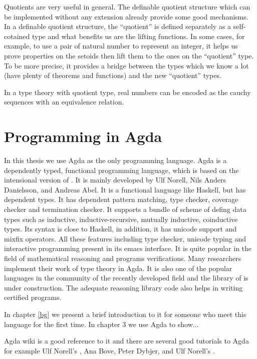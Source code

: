 
Quotients are very useful in general. The definable quotient structure
which can be implemented without any extension already provide some
good mechanisms. In a definable quotient structure, the ``quotient''
is defined separately as a self-cotained type and what benefits us are
the lifting functions. In some cases, for example, to use a pair of
natural number to represent an integer, it helps us prove properties
on the setoids then lift them to the ones on the ``quotient'' type. To
be more precise, it provides a bridge between the types which we know
a lot (have plenty of theorems and functions) and the new
``quotient'' types.


In a type theory with quotient type, real numbers can be encoded as
the cauchy sequences with an equivalence relation.


\section{Programming in Agda}

In this thesis we use Agda as the only programming language. Agda is a dependently typed, functional programming language, which is
based on the intensional version of \mltt. It is mainly developed by
Ulf Norell, Nils Anders Danielsson, and Andreas Abel.
It is a functional language like Haskell, but has dependent types. It has dependent pattern
matching, type checker, coverage checker and termination checker. It
supports a bundle of scheme of defing data types such as inductive, inductive-recursive, mutually inductive,
coinductive types. Its syntax is close to Haskell, in addition, it has
unicode support and mixfix operators. All these features including
type checker, unicode typing and interactive programming present in
its emacs interface. It is quite popular in the field of mathematical reasoning and programs
verifications. Many researchers implement their work of type theory in
Agda. It is also one of the popular languages in the community of the recently
developed field \hott and the library of \hott is under construction.
The adequate reasoning library code also helps in writing certified programs.

In chapter \ref{bg} we present a brief introduction to it for someone
who meet this language for the first time. In chapter 3 we use Agda to
show...

Agda wiki\cite{agdawiki:main} is a good reference to it and there are
several good tutorials to Agda for example Ulf Norell's
\cite{tutorial}, Ana Bove, Peter Dybjer, and Ulf Norell's \cite{bove2009brief}.

